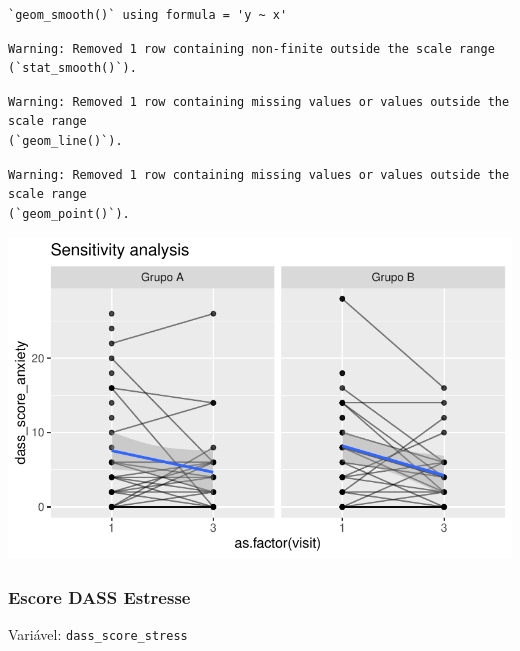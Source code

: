 \documentclass[
  letterpaper,
  DIV=11,
  numbers=noendperiod]{scrartcl}
\begin{document}
\begin{verbatim}
`geom_smooth()` using formula = 'y ~ x'
\end{verbatim}

\begin{verbatim}
Warning: Removed 1 row containing non-finite outside the scale range
(`stat_smooth()`).
\end{verbatim}

\begin{verbatim}
Warning: Removed 1 row containing missing values or values outside the scale range
(`geom_line()`).
\end{verbatim}

\begin{verbatim}
Warning: Removed 1 row containing missing values or values outside the scale range
(`geom_point()`).
\end{verbatim}

\includegraphics{Outcomes_V1V2V3_files/figure-pdf/dass_score_anxiety_6-2.pdf}

\subsubsection{Escore DASS Estresse}\label{escore-dass-estresse}

Variável: \texttt{dass\_score\_stress}
\end{document}
